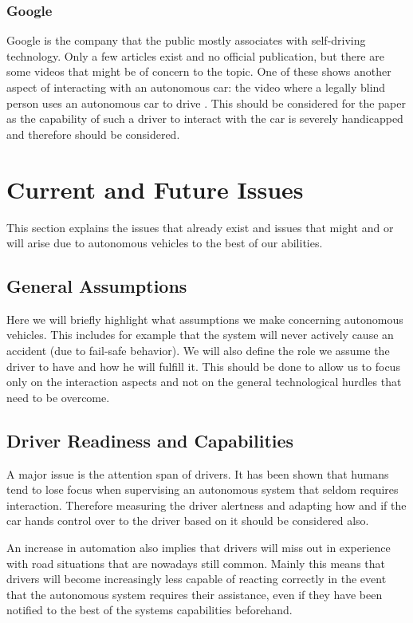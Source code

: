 \documentclass{acm_proc_article-sp}
\begin{document}
\subsubsection{Google}

Google is the company that the public mostly associates with self-driving technology.
Only a few articles exist and no official publication, but there are some videos that might be of concern to the topic.
One of these shows another aspect of interacting with an autonomous car: the video where a legally blind person uses an autonomous car to drive \cite{www:google_blind}.
This should be considered for the paper as the capability of such a driver to interact with the car is severely handicapped and therefore should be considered.

\section{Current and Future Issues}

This section explains the issues that already exist and issues that might and or will arise due to autonomous vehicles to the best of our abilities.

\subsection{General Assumptions}

Here we will briefly highlight what assumptions we make concerning autonomous vehicles.
This includes for example that the system will never actively cause an accident (due to fail-safe behavior).
We will also define the role we assume the driver to have and how he will fulfill it.
This should be done to allow us to focus only on the interaction aspects and not on the general technological hurdles that need to be overcome.

\subsection{Driver Readiness and Capabilities}

A major issue is the attention span of drivers.
It has been shown that humans tend to lose focus when supervising an autonomous system that seldom requires interaction.
Therefore measuring the driver alertness and adapting how and if the car hands control over to the driver based on it should be considered also.

An increase in automation also implies that drivers will miss out in experience with road situations that are nowadays still common.
Mainly this means that drivers will become increasingly less capable of reacting correctly in the event that the autonomous system requires their assistance, even if they have been notified to the best of the systems capabilities beforehand.
\end{document}
